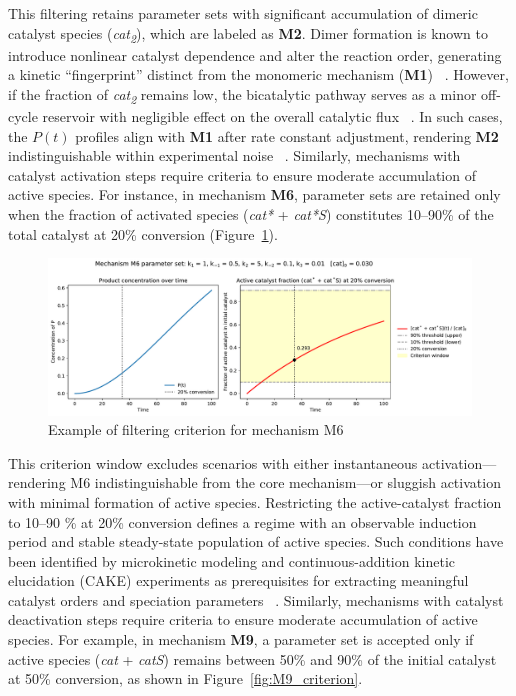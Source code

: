 \documentclass{dissertation}
\begin{document}
This filtering retains parameter sets with significant accumulation of dimeric catalyst species (\emph{cat\textsubscript{2}}), which are labeled as \textbf{M2}. Dimer formation is known to introduce nonlinear catalyst dependence and alter the reaction order, generating a kinetic “fingerprint” distinct from the monomeric mechanism (\textbf{M1}) ~\cite{Rosner2001}. However, if the fraction of \emph{cat\textsubscript{2}} remains low, the bicatalytic pathway serves as a minor off-cycle reservoir with negligible effect on the overall catalytic flux ~\cite{Rai2024}. In such cases, the $P(t)$ profiles align with \textbf{M1} after rate constant adjustment, rendering \textbf{M2} indistinguishable within experimental noise ~\cite{Sahharova2023}.  
Similarly, mechanisms with catalyst activation steps require criteria to ensure moderate accumulation of active species. For instance, in mechanism \textbf{M6}, parameter sets are retained only when the fraction of activated species (\emph{cat*} + \emph{cat*S}) constitutes 10–90\% of the total catalyst at 20\% conversion (Figure~\ref{fig:M6_criterion}).




\begin{figure}[H]
    \centering
    \includegraphics[width=\textwidth]{data_generation/M6.pdf}
    \caption{Example of filtering criterion for mechanism M6}
    \label{fig:M6_criterion}
\end{figure}

This criterion window excludes scenarios with either instantaneous activation—rendering M6 indistinguishable from the core mechanism—or sluggish activation with minimal formation of active species. Restricting the active-catalyst fraction to 10–90 \% at 20\% conversion defines a regime with an observable induction period and stable steady-state population of active species. Such conditions have been identified by microkinetic modeling and continuous-addition kinetic elucidation (CAKE) experiments as prerequisites for extracting meaningful catalyst orders and speciation parameters ~\cite{Williams2023}. Similarly, mechanisms with catalyst deactivation steps require criteria to ensure moderate accumulation of active species. For example, in mechanism \textbf{M9}, a parameter set is accepted only if active species (\emph{cat} + \emph{catS}) remains between 50\% and 90\% of the initial catalyst at 50\% conversion, as shown in Figure~\ref{fig:M9_criterion}.
\end{document}
